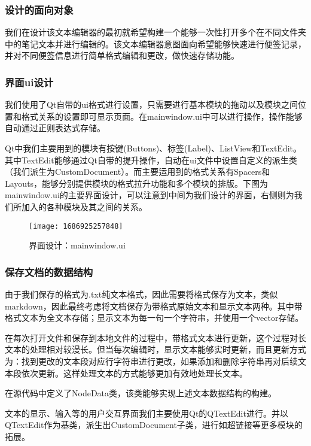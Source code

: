\documentclass{./source/Report}
\begin{document}
\subsubsection{设计的面向对象}
我们在设计该文本编辑器的最初就希望构建一个能够一次性打开多个在不同文件夹中的笔记文本并进行编辑的。该文本编辑器意图面向希望能够快速进行便签记录，并对不同便签信息进行简单格式编辑和更改，做快速存储功能。
\subsubsection{界面ui设计}
我们使用了Qt自带的ui格式进行设置，只需要进行基本模块的拖动以及模块之间位置和格式关系的设置即可显示页面。在mainwindow.ui中可以进行操作，操作能够自动通过正则表达式存储。\par
Qt中我们主要用到的模块有按键(Buttons)、标签(Label)、ListView和TextEdit。其中TextEdit能够通过Qt自带的提升操作，自动在ui文件中设置自定义的派生类（我们派生为CustomDocument）。而主要运用到的格式关系有Spacers和Layouts，能够分别提供模块的格式拉升功能和多个模块的排版。下图为mainwindow.ui的主要界面设计，可以注意到中间为我们设计的界面，右侧则为我们所加入的各种模块及其之间的关系。
\begin{figure}[!htbp]
    \centering
    \begin{minipage}{0.45\textwidth}
        \centering
        \texttt{[image: 1686925257848]}
            \caption{界面设计：mainwindow.ui}
    \end{minipage}
\end{figure}
\subsubsection{保存文档的数据结构}
由于我们保存的格式为.txt纯文本格式，因此需要将格式保存为文本，类似markdown，因此最终考虑将文档保存为带格式原始文本和显示文本两种。其中带格式文本为全文本存储；显示文本为每一句一个字符串，并使用一个vector存储。\par
在每次打开文件和保存到本地文件的过程中，带格式文本进行更新，这个过程对长文本的处理相对较漫长。但当每次编辑时，显示文本能够实时更新，而且更新方式为：找到更改的文本段对应行字符串进行更改，如果添加和删除字符串再对后续文本段依次更新。这样处理文本的方式能够更加有效地处理长文本。\par
在源代码中定义了NodeData类，该类能够实现上述文本数据结构的构建。\par
文本的显示、输入等的用户交互界面我们主要使用Qt的QTextEdit进行。并以QTextEdit作为基类，派生出CustomDocument子类，进行如超链接等更多模块的拓展。\par
\end{document}
